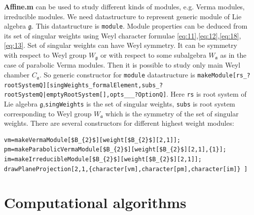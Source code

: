 \documentclass[preprint,12pt]{elsarticle}
\newcommand{\gf}{\mathfrak{g}}
\newcommand{\af}{\mathfrak{a}}
\begin{document}
{\bf Affine.m} can be used to study different kinds of modules, e.g. Verma modules, irreducible modules.  We need datastructure to represent generic module of Lie algebra $\gf$. This datastructure is \lstinline{module}. Module properties can be deduced from its set of singular weights using Weyl character formulae \eqref{eq:11},\eqref{eq:12},\eqref{eq:18},\eqref{eq:13}. Set of singular weights can have Weyl symmetry. It can be symmetry with respect to Weyl group $W_{\gf}$ or with respect to some subalgebra $W_{\af}$ as in the case of parabolic Verma modules. Then it is possible to study only main Weyl chamber $C_{\af}$. So generic constructor for \lstinline{module} datastructure is \lstinline{makeModule[rs_?rootSystemQ][singWeights_formalElement,subs_?rootSystemQ|emptyRootSystem[],opts___?OptionQ]}. Here \lstinline{rs} is root system of Lie algebra $\gf$,\lstinline{singWeights} is the set of singular weights,  \lstinline{subs} is root system corresponding to Weyl group $W_{\af}$ which is the symmetry of the set of singular weights.
There are several constructors for different highest weight modules:
\begin{lstlisting}[mathescape=true]
vm=makeVermaModule[$B_{2}$][weight[$B_{2}$][2,1]];
pm=makeParabolicVermaModule[$B_{2}$][weight[$B_{2}$][2,1],{1}];
im=makeIrreducibleModule[$B_{2}$][weight[$B_{2}$][2,1]];
drawPlaneProjection[2,1,{character[vm],character[pm],character[im]} ]
\end{lstlisting}
\section{Computational algorithms}
\label{sec:comp-algor}
\end{document}
